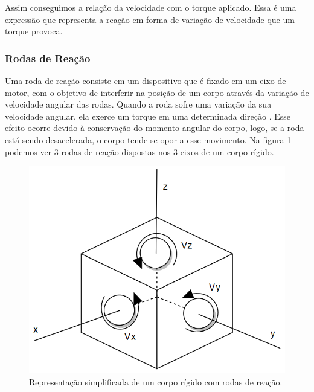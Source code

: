 Assim conseguimos a relação da velocidade com o torque aplicado. Essa é uma expressão que representa a reação em forma de variação de velocidade que um torque provoca.



\subsubsection{Rodas de Reação}

Uma roda de reação consiste em um dispositivo que é fixado em um eixo de motor, com o objetivo de interferir na posição de um corpo através da variação de velocidade angular das rodas. Quando a roda sofre uma variação da sua velocidade angular, ela exerce um torque em uma determinada direção \cite{BongWie2001}. Esse efeito ocorre devido à conservação do momento angular do corpo, logo, se a roda está sendo desacelerada, o corpo tende se opor a esse movimento. Na figura \ref{fig:satellite_controlhand_p1306} podemos ver 3 rodas de reação dispostas nos 3 eixos de um corpo rígido.

\begin{figure}[H]
  \caption{Representação simplificada de um corpo rígido com rodas de reação.}
  \begin{center}
      \includegraphics[scale=0.65]{referencial/img/satellite_controlhand_p1306}
  \end{center}
  \label{fig:satellite_controlhand_p1306}
\end{figure}

